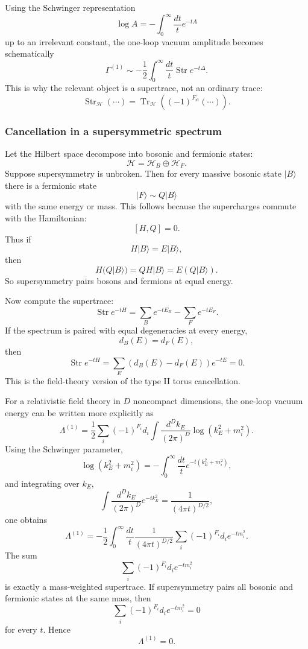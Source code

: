 \documentclass[
  10pt,
  a4paper,
  openany]{book}
\begin{document}
Using the Schwinger representation \[
\log A
=
-
\int_0^\infty\frac{dt}{t}e^{-tA}
\] up to an irrelevant constant, the one-loop vacuum amplitude becomes
schematically \[
\Gamma^{(1)}
\sim
-
\frac{1}{2}
\int_0^\infty\frac{dt}{t}
\operatorname{Str}
e^{-t\Delta}.
\] This is why the relevant object is a supertrace, not an ordinary
trace: \[
\operatorname{Str}_{\mathcal H}(\cdots)
=
\operatorname{Tr}_{\mathcal H}
\left((-1)^{F_{\mathrm{st}}}(\cdots)\right).
\]

\subsubsection{Cancellation in a supersymmetric
spectrum}\label{cancellation-in-a-supersymmetric-spectrum}

Let the Hilbert space decompose into bosonic and fermionic states: \[
\mathcal H
=
\mathcal H_B\oplus\mathcal H_F.
\] Suppose supersymmetry is unbroken. Then for every massive bosonic
state \(|B\rangle\) there is a fermionic state \[
|F\rangle
\sim
Q|B\rangle
\] with the same energy or mass. This follows because the supercharges
commute with the Hamiltonian: \[
[H,Q]=0.
\] Thus if \[
H|B\rangle=E|B\rangle,
\] then \[
H(Q|B\rangle)
=
QH|B\rangle
=
E(Q|B\rangle).
\] So supersymmetry pairs bosons and fermions at equal energy.

Now compute the supertrace: \[
\operatorname{Str}e^{-tH}
=
\sum_{B}e^{-tE_B}
-
\sum_{F}e^{-tE_F}.
\] If the spectrum is paired with equal degeneracies at every energy, \[
d_B(E)=d_F(E),
\] then \[
\operatorname{Str}e^{-tH}
=
\sum_E
\left(d_B(E)-d_F(E)\right)e^{-tE}
=
0.
\] This is the field-theory version of the type II torus cancellation.

For a relativistic field theory in \(D\) noncompact dimensions, the
one-loop vacuum energy can be written more explicitly as \[
\Lambda^{(1)}
=
\frac{1}{2}
\sum_i
(-1)^{F_i}
d_i
\int\frac{d^Dk_E}{(2\pi)^D}
\log(k_E^2+m_i^2).
\] Using the Schwinger parameter, \[
\log(k_E^2+m_i^2)
=
-
\int_0^\infty\frac{dt}{t}
e^{-t(k_E^2+m_i^2)},
\] and integrating over \(k_E\), \[
\int\frac{d^Dk_E}{(2\pi)^D}e^{-tk_E^2}
=
\frac{1}{(4\pi t)^{D/2}},
\] one obtains \[
\Lambda^{(1)}
=
-
\frac{1}{2}
\int_0^\infty\frac{dt}{t}
\frac{1}{(4\pi t)^{D/2}}
\sum_i
(-1)^{F_i}d_i e^{-tm_i^2}.
\] The sum \[
\sum_i(-1)^{F_i}d_i e^{-tm_i^2}
\] is exactly a mass-weighted supertrace. If supersymmetry pairs all
bosonic and fermionic states at the same mass, then \[
\sum_i(-1)^{F_i}d_i e^{-tm_i^2}=0
\] for every \(t\). Hence \[
\Lambda^{(1)}=0.
\]
\end{document}
